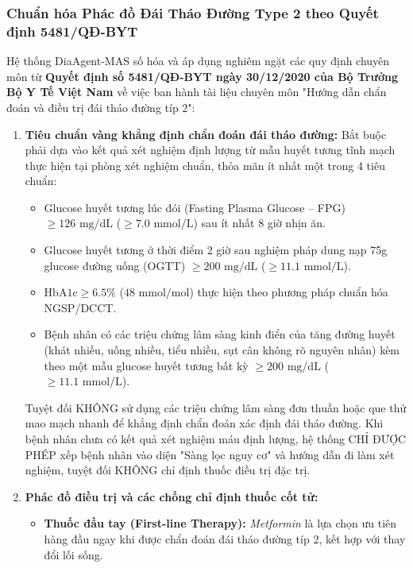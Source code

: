 \documentclass[12pt,a4paper]{article}
\begin{document}
\subsubsection{Chuẩn hóa Phác đồ Đái Tháo Đường Type 2 theo Quyết định 5481/QĐ-BYT}
Hệ thống DiaAgent-MAS số hóa và áp dụng nghiêm ngặt các quy định chuyên môn từ \textbf{Quyết định số 5481/QĐ-BYT ngày 30/12/2020 của Bộ Trưởng Bộ Y Tế Việt Nam} về việc ban hành tài liệu chuyên môn "Hướng dẫn chẩn đoán và điều trị đái tháo đường típ 2":
\begin{enumerate}[leftmargin=1.2cm]
    \item \textbf{Tiêu chuẩn vàng khẳng định chẩn đoán đái tháo đường:}
    Bắt buộc phải dựa vào kết quả xét nghiệm định lượng từ mẫu huyết tương tĩnh mạch thực hiện tại phòng xét nghiệm chuẩn, thỏa mãn ít nhất một trong 4 tiêu chuẩn:
    \begin{itemize}[leftmargin=0.8cm]
        \item Glucose huyết tương lúc đói (Fasting Plasma Glucose -- FPG) $\ge 126\text{ mg/dL}$ ($\ge 7.0\text{ mmol/L}$) sau ít nhất 8 giờ nhịn ăn.
        \item Glucose huyết tương ở thời điểm 2 giờ sau nghiệm pháp dung nạp 75g glucose đường uống (OGTT) $\ge 200\text{ mg/dL}$ ($\ge 11.1\text{ mmol/L}$).
        \item $\text{HbA1c} \ge 6.5\%$ ($48\text{ mmol/mol}$) thực hiện theo phương pháp chuẩn hóa NGSP/DCCT.
        \item Bệnh nhân có các triệu chứng lâm sàng kinh điển của tăng đường huyết (khát nhiều, uống nhiều, tiểu nhiều, sụt cân không rõ nguyên nhân) kèm theo một mẫu glucose huyết tương bất kỳ $\ge 200\text{ mg/dL}$ ($\ge 11.1\text{ mmol/L}$).
    \end{itemize}
    \begin{tcolorbox}[colback=warnbg,colframe=warnframe,title=Nguyên tắc An toàn Bắt buộc theo QĐ 5481/QĐ-BYT]
    Tuyệt đối KHÔNG sử dụng các triệu chứng lâm sàng đơn thuần hoặc que thử mao mạch nhanh để khẳng định chẩn đoán xác định đái tháo đường. Khi bệnh nhân chưa có kết quả xét nghiệm máu định lượng, hệ thống CHỈ ĐƯỢC PHÉP xếp bệnh nhân vào diện "Sàng lọc nguy cơ" và hướng dẫn đi làm xét nghiệm, tuyệt đối KHÔNG chỉ định thuốc điều trị đặc trị.
    \end{tcolorbox}
    \item \textbf{Phác đồ điều trị và các chống chỉ định thuốc cốt tử:}
    \begin{itemize}[leftmargin=0.8cm]
        \item \textbf{Thuốc đầu tay (First-line Therapy):} \textit{Metformin} là lựa chọn ưu tiên hàng đầu ngay khi được chẩn đoán đái tháo đường típ 2, kết hợp với thay đổi lối sống.

\end{itemize}
\end{enumerate}
\end{document}
